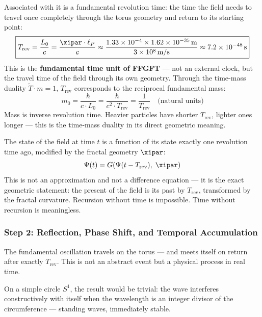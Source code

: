 Associated with it is a fundamental revolution time: the time the field needs
to travel once completely through the torus geometry and return to its starting point:
\begin{equation}
    \boxed{T_\text{rev} = \frac{L_0}{c} = \frac{\xipar \cdot \ell_P}{c}
    \approx \frac{1.33 \times 10^{-4} \times 1.62 \times 10^{-35}\,\text{m}}{3 \times 10^8\,\text{m/s}}
    \approx 7.2 \times 10^{-48}\,\text{s}}
    \label{eq:Trev}
\end{equation}
This is the \textbf{fundamental time unit of FFGFT} — not an external clock,
but the travel time of the field through its own geometry. Through the time-mass
duality $\tilde{T} \cdot m = 1$, $T_\text{rev}$ corresponds to the reciprocal
fundamental mass:
\begin{equation}
    m_0 = \frac{\hbar}{c \cdot L_0} = \frac{\hbar}{c^2 \cdot T_\text{rev}}
    = \frac{1}{T_\text{rev}} \quad \text{(natural units)}
\end{equation}
Mass is inverse revolution time. Heavier particles have shorter $T_\text{rev}$,
lighter ones longer — this is the time-mass duality in its direct geometric meaning.

\begin{foundation}
The state of the field at time $t$ is a function of its state exactly one
revolution time ago, modified by the fractal geometry $\xipar$:
\begin{equation}
    \Psi(t) = G\!\left(\Psi(t - T_\text{rev}),\; \xipar\right)
    \label{eq:recursion}
\end{equation}
This is not an approximation and not a difference equation — it is the exact
geometric statement: the present of the field is its past by $T_\text{rev}$,
transformed by the fractal curvature. Recursion without time is impossible.
Time without recursion is meaningless.
\end{foundation}

\subsubsection*{Step 2: Reflection, Phase Shift, and Temporal Accumulation}

The fundamental oscillation travels on the torus — and meets itself on return
after exactly $T_\text{rev}$. This is not an abstract event but a physical process
in real time.

On a simple circle $S^1$, the result would be trivial: the wave interferes
constructively with itself when the wavelength is an integer divisor of the
circumference — standing waves, immediately stable.

